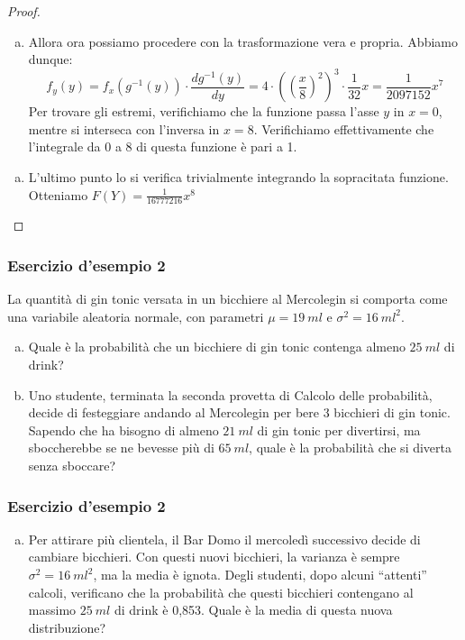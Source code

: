\documentclass{beamer}
\begin{document}
\begin{frame}[fragile]
	\begin{proof}\renewcommand{\qedsymbol}{$\blacksquare$}
		\begin{enumerate}[(b)]
			\item Allora ora possiamo procedere con la trasformazione vera e propria. Abbiamo dunque:
			      \[
				      f_y(y) = f_x(g^{-1}(y)) \cdot \frac{dg^{-1}(y)}{dy} = 4 \cdot ((\frac{x}{8})^2)^3 \cdot \frac{1}{32} x = \frac{1}{2097152} x^7
			      \]
			      Per trovare gli estremi, verifichiamo che la funzione passa l'asse $y$ in $x = 0$, mentre si interseca con l'inversa in $x = 8$. Verifichiamo effettivamente che l'integrale da 0 a 8 di questa funzione è pari a 1.
		\end{enumerate}
		\begin{enumerate}[(c)]
			\item L'ultimo punto lo si verifica trivialmente integrando la sopracitata funzione. Otteniamo $F(Y) = \frac{1}{16777216} x^8$
		\end{enumerate}
	\end{proof}
\end{frame}

\begin{frame}
	\frametitle{Esercizio d'esempio 2}
	\begin{exercise}[20210524-2]
		La quantità di gin tonic versata in un bicchiere al Mercolegin si comporta come una variabile aleatoria normale, con parametri $\mu = 19 \: ml$ e $\sigma^2 = 16 \: ml^2$.

		\begin{enumerate}[(a)]
			\item Quale è la probabilità che un bicchiere di gin tonic contenga almeno $25 \: ml$ di drink?
			\item Uno studente, terminata la seconda provetta di Calcolo delle probabilità, decide di festeggiare andando al Mercolegin per bere 3 bicchieri di gin tonic. Sapendo che ha bisogno di almeno $21 \: ml$ di gin tonic per divertirsi, ma sboccherebbe se ne bevesse più di $65 \: ml$, quale è la probabilità che si diverta senza sboccare?
		\end{enumerate}
	\end{exercise}
\end{frame}

\begin{frame}
	\frametitle{Esercizio d'esempio 2}
	\begin{exercise}[20210524-2]
		\begin{enumerate}[(c)]
			\item Per attirare più clientela, il Bar Domo il mercoledì successivo decide di cambiare bicchieri. Con questi nuovi bicchieri, la varianza è sempre $\sigma^2 = 16 \: ml^2$, ma la media è ignota. Degli studenti, dopo alcuni ``attenti'' calcoli, verificano che la probabilità che questi bicchieri contengano al massimo $25 \: ml$ di drink è 0,853. Quale è la media di questa nuova distribuzione?
		\end{enumerate}
	\end{exercise}
\end{frame}
\end{document}

